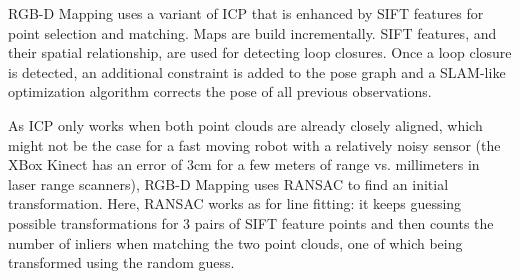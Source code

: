 \documentclass[paper=6.14in:9.21in,pagesize=pdftex,11pt,twoside,openright]{scrbook}
\begin{document}
RGB-D Mapping uses a variant of ICP that is enhanced by SIFT features for point selection and matching. Maps are build incrementally. SIFT features, and their spatial relationship, are used for detecting loop closures. Once a loop closure is detected, an additional constraint is added to the pose graph and a SLAM-like optimization algorithm corrects the pose of all previous observations.

As ICP only works when both point clouds are already closely aligned, which might not be the case for a fast moving robot with a relatively noisy sensor (the XBox Kinect has an error of 3cm for a few meters of range vs. millimeters in laser range scanners), RGB-D Mapping uses RANSAC to find an initial transformation. Here, RANSAC works as for line fitting: it keeps guessing possible transformations for 3 pairs of SIFT feature points and then counts the number of inliers when matching the two point clouds, one of which being transformed using the random guess.



\appendix











\printindex
\end{document}
